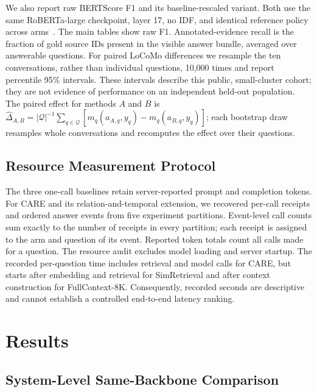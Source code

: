 \documentclass[11pt]{article}
\newcommand{\care}{\textsc{CARE}}
\begin{document}
We also report raw BERTScore F1 and its baseline-rescaled variant. Both use
the same RoBERTa-large checkpoint, layer 17, no IDF, and identical
reference policy across arms~\cite{zhang2020bertscore}. The main tables
show raw F1. Annotated-evidence recall is the fraction of gold source IDs
present in the visible answer bundle, averaged over answerable questions.
For paired LoCoMo differences we resample the ten conversations, rather
than individual questions, 10,000 times and report percentile 95\%
intervals. These intervals describe this public, small-cluster cohort; they
are not evidence of performance on an independent held-out population.
The paired effect for methods $A$ and $B$ is
$\hat\Delta_{A,B}=|\mathcal Q|^{-1}\sum_{q\in\mathcal Q}
[m_q(a_{A,q},y_q)-m_q(a_{B,q},y_q)]$; each bootstrap draw resamples whole
conversations and recomputes the effect over their questions.

\subsection{Resource Measurement Protocol}

The three one-call baselines retain server-reported prompt and completion
tokens. For \care{} and its relation-and-temporal extension, we recovered
per-call receipts and ordered answer events from five experiment partitions.
Event-level call counts sum exactly to the number of receipts in every
partition; each receipt is assigned to the arm
and question of its event. Reported token totals count all calls made for a
question. The resource audit excludes model loading and server startup.
The recorded per-question time includes retrieval and model calls for
\care{}, but starts after embedding and retrieval for SimRetrieval and after
context construction for FullContext-8K. Consequently, recorded seconds
are descriptive and cannot establish a controlled end-to-end latency ranking.

\section{Results}
\label{sec:results}

\subsection{System-Level Same-Backbone Comparison}
\end{document}
